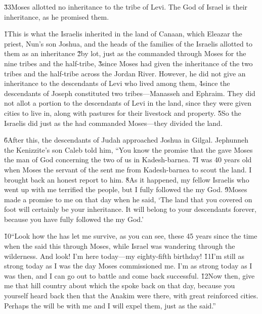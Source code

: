 \v{33}Moses allotted no inheritance to the tribe of Levi. The  God of Israel is their inheritance, as he promised them.

\v{1}This is what the Israelis inherited in the land of Canaan, which Eleazar the priest, Nun's son Joshua, and the heads of the families of the Israelis allotted to them as an inheritance \v{2}by lot, just as the  commanded through Moses for the nine tribes and the half-tribe, \v{3}since Moses had given the inheritance of the two tribes and the half-tribe across the Jordan River. However, he did not give an inheritance to the descendants of Levi who lived among them, \v{4}since the descendants of Joseph constituted two tribes---Manasseh and Ephraim. They did not allot a portion to the descendants of Levi in the land, since they were given cities to live in, along with pastures for their livestock and property. \v{5}So the Israelis did just as the  had commanded Moses---they divided the land.

\v{6}After this, the descendants of Judah approached Joshua in Gilgal. Jephunneh the Kenizzite's son Caleb told him, ``You know the promise that the  gave Moses the man of God concerning the two of us in Kadesh-barnea. \v{7}I was 40 years old when Moses the servant of the  sent me from Kadesh-barnea to scout the land. I brought back an honest report to him. \v{8}As it happened, my fellow Israelis who went up with me terrified the people, but I fully followed the  my God. \v{9}Moses made a promise to me on that day when he said, `The land that you covered on foot will certainly be your inheritance. It will belong to your descendants forever, because you have fully followed the  my God.'

\v{10}``Look how the  has let me survive, as you can see, these 45 years since the time when the  said this through Moses, while Israel was wandering through the wilderness. And look! I'm here today---my eighty-fifth birthday! \v{11}I'm still as strong today as I was the day Moses commissioned me. I'm as strong today as I was then, and I can go out to battle and come back successful. \v{12}Now then, give me that hill country about which the  spoke back on that day, because you yourself heard back then that the Anakim were there, with great reinforced cities. Perhaps the  will be with me and I will expel them, just as the  said.''

